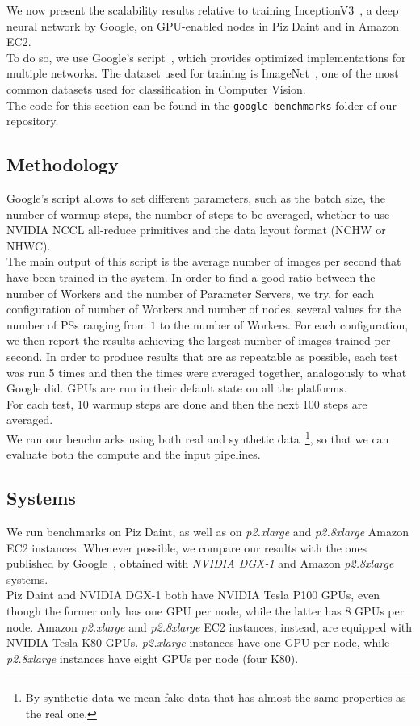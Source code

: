 We now present the scalability results relative to training InceptionV3~\cite{inception3}, a deep neural network by Google, on GPU-enabled nodes in Piz Daint and in Amazon EC2.\\
To do so, we use Google's script~\cite{cnn_benchmarks}, which provides optimized implementations for multiple networks.
The dataset used for training is ImageNet~\cite{imagenet}, one of the most common datasets used for classification in Computer Vision.\\

The code for this section can be found in the \texttt{google-benchmarks} folder of our repository.

\subsection{Methodology}
Google's script allows to set different parameters, such as the batch size, the number of warmup steps, the number of steps to be averaged, whether to use NVIDIA NCCL all-reduce primitives and the data layout format (NCHW or NHWC).\\

The main output of this script is the average number of images per second that have been trained in the system.
In order to find a good ratio between the number of Workers and the number of Parameter Servers, we try, for each configuration of number of Workers and number of nodes, several values for the number of PSs ranging from $1$ to the number of Workers.
For each configuration, we then report the results achieving the largest number of images trained per second.
In order to produce results that are as repeatable as possible, each test was run 5 times and then the times were averaged together, analogously to what Google did. 
GPUs are run in their default state on all the platforms.\\
For each test, 10 warmup steps are done and then the next 100 steps are averaged.\\

We ran our benchmarks using both real and synthetic data~\footnote{By synthetic data we mean fake data that has almost the same properties as the real one.}, so that we can evaluate both the compute and the input pipelines.

\subsection{Systems}
We run benchmarks on Piz Daint, as well as on \textit{p2.xlarge} and \textit{p2.8xlarge} Amazon EC2 instances.
Whenever possible, we compare our results with the ones published by Google~\cite{google_benchmarks}, obtained with \textit{NVIDIA DGX-1} and Amazon \textit{p2.8xlarge} systems.\\
Piz Daint and NVIDIA DGX-1 both have NVIDIA Tesla P100 GPUs, even though the former only has one GPU per node, while the latter has 8 GPUs per node.
Amazon \textit{p2.xlarge} and \textit{p2.8xlarge} EC2 instances, instead, are equipped with NVIDIA Tesla K80 GPUs. 
\textit{p2.xlarge} instances have one GPU per node, while \textit{p2.8xlarge} instances have eight GPUs per node (four K80).

